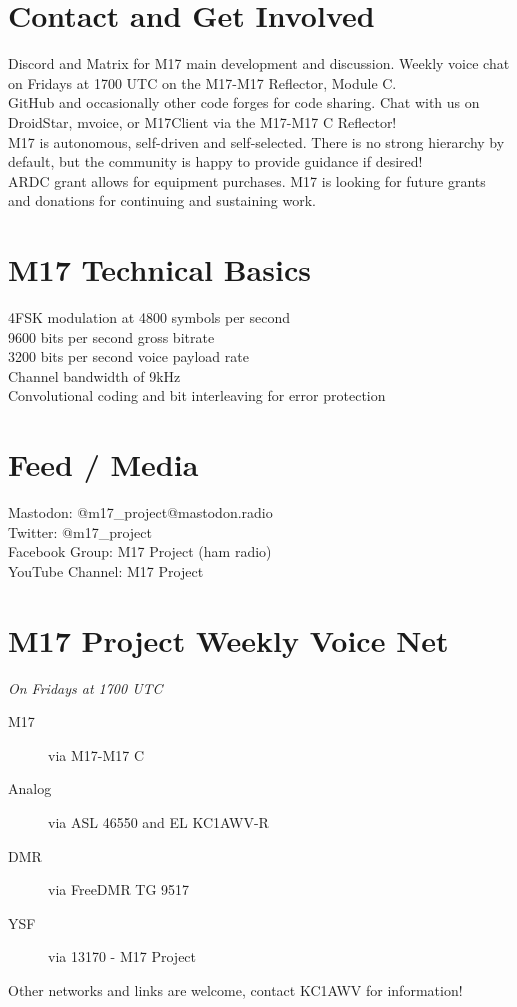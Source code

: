 \documentclass[10pt,letterpaper,notitlepage]{article}
\begin{document}
  \begin{multicols}{2}
  \section*{Contact and Get Involved}
    \justifying
    Discord and Matrix for M17 main development and discussion. Weekly voice chat on Fridays at 1700 UTC on the M17-M17 Reflector, Module C.\\
    GitHub and occasionally other code forges for code sharing. Chat with us on DroidStar, mvoice, or M17Client via the M17-M17 C Reflector!\\
    M17 is autonomous, self-driven and self-selected. There is no strong hierarchy by default, but the community is happy to provide guidance if desired!\\
    ARDC grant allows for equipment purchases. M17 is looking for future grants and donations for continuing and sustaining work.
  \section*{M17 Technical Basics}
    \justifying
    4FSK modulation at 4800 symbols per second\\
    9600 bits per second gross bitrate\\
    3200 bits per second voice payload rate\\
    Channel bandwidth of 9kHz\\
    Convolutional coding and bit interleaving for error protection\\
  \columnbreak
  \section*{Feed / Media}
    \justifying
    Mastodon: @m17\_project@mastodon.radio\\
    Twitter: @m17\_project\\
    Facebook Group: M17 Project (ham radio)\\
    YouTube Channel: M17 Project\\
  \section*{M17 Project Weekly Voice Net}
    \centering
    \emph{On Fridays at 1700 UTC}\\
    \raggedright
    \begin{description}
      \item[M17] via M17-M17 C
      \item[Analog] via ASL 46550 and EL KC1AWV-R
      \item[DMR] via FreeDMR TG 9517
      \item[YSF] via 13170 - M17 Project
    \end{description}
    Other networks and links are welcome, contact KC1AWV for information!
    \vfill\null
  \end{multicols}
  \centering
\end{document}
